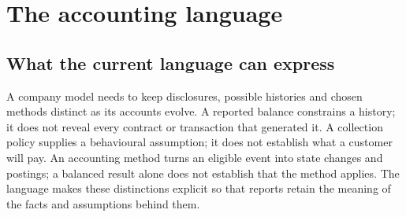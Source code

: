\chapter{The accounting language}
\label{ch:language}

\section{What the current language can express}

A company model needs to keep disclosures, possible histories and chosen
methods distinct as its accounts evolve. A reported balance constrains a
history; it does not reveal every contract or transaction that generated it.
A collection policy supplies a behavioural assumption; it does not establish
what a customer will pay. An accounting method turns an eligible event into
state changes and postings; a balanced result alone does not establish that
the method applies. The language makes these distinctions explicit so that
reports retain the meaning of the facts and assumptions behind them.

